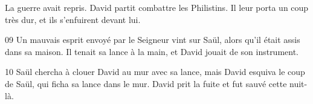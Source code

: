 La guerre avait repris. David partit combattre les Philistins. Il leur porta un coup très dur, et ils s’enfuirent devant lui.

09 Un mauvais esprit envoyé par le Seigneur vint sur Saül, alors qu’il était assis dans sa maison. Il tenait sa lance à la main, et David jouait de son instrument.

10 Saül chercha à clouer David au mur avec sa lance, mais David esquiva le coup de Saül, qui ficha sa lance dans le mur. David prit la fuite et fut sauvé cette nuit-là.